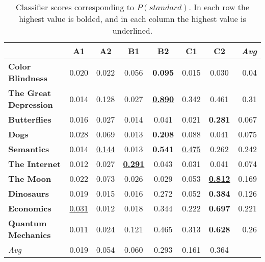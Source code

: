\begin{table*}
    \centering
    \begin{tabular}{lccccccr}
        \hline
                                        & \textbf{A1}           & \textbf{A2}           & \textbf{B1}                   & \textbf{B2}                   & \textbf{C1}       & \textbf{C2} & \emph{Avg}  \\
        \hline
       \textbf{Color Blindness}         & 0.020                 & 0.022                 & 0.056                         & \textbf{0.095}                & 0.015             & 0.030 & 0.04 \\
       \hline
       \textbf{The Great Depression}    & 0.014                 & 0.128                 & 0.027                         & \underline{\textbf{0.890}}    & 0.342             & 0.461 & 0.31 \\
       \hline
       \textbf{Butterflies}             & 0.016                 & 0.027                 & 0.014                         & 0.041                         & 0.021             & \textbf{0.281} & 0.067 \\
       \hline
       \textbf{Dogs}                    & 0.028                 & 0.069                 & 0.013                         & \textbf{0.208}                & 0.088             & 0.041 & 0.075 \\
       \hline
       \textbf{Semantics}               & 0.014                 & \underline{0.144}     & 0.013                         & \textbf{0.541}                & \underline{0.475} & 0.262 & 0.242 \\
       \hline
       \textbf{The Internet}            & 0.012                 & 0.027                 & \underline{\textbf{0.291}}    & 0.043                         & 0.031             & 0.041 & 0.074 \\
       \hline
       \textbf{The Moon}                & 0.022                 & 0.073                 & 0.026                         & 0.029                         & 0.053             & \underline{\textbf{0.812}} & 0.169 \\
       \hline
       \textbf{Dinosaurs}               & 0.019                 & 0.015                 & 0.016                         & 0.272                         & 0.052             & \textbf{0.384} & 0.126 \\
       \hline
       \textbf{Economics}               & \underline{0.031}     & 0.012                 & 0.018                         & 0.344                         & 0.222             & \textbf{0.697} & 0.221 \\
       \hline
       \textbf{Quantum Mechanics}       & 0.011                 & 0.024                 & 0.121                         & 0.465                         & 0.313             & \textbf{0.628} & 0.26 \\
       \hline
       \emph{Avg}                              & 0.019              & 0.054              & 0.060                      & 0.293                      & 0.161          & 0.364          & \\
       \hline
       \end{tabular}

       \caption{
            \centering
            Classifier scores corresponding to $P(standard)$. In each row the highest value is bolded, and in each column the highest value is underlined.}
        \label{tab:classifier}
\end{table*}